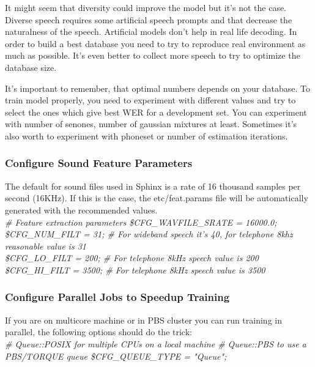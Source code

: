 \documentclass[12pt,a4paper,oldfontcommands]{memoir}
\begin{document}
It might seem that diversity could improve the model but it's not the case. Diverse speech requires some artificial speech prompts and that decrease the naturalness of the speech. Artificial models don't help in real life decoding. In order to build a best database you need to try to reproduce real environment as much as possible. It's even better to collect more speech to try to optimize the database size.

It's important to remember, that optimal numbers depends on your database. To train model properly, you need to experiment with different values and try to select the ones which give best WER for a development set. You can experiment with number of senones, number of gaussian mixtures at least. Sometimes it's also worth to experiment with phoneset or number of estimation iterations. 

\subsubsection{Configure Sound Feature Parameters}
The default for sound files used in Sphinx is a rate of 16 thousand samples per second (16KHz). If this is the case, the etc/feat.params file will be automatically generated with the recommended values. \\
\textit{
\# Feature extraction parameters
\$CFG\_WAVFILE\_SRATE = 16000.0;\\
\$CFG\_NUM\_FILT = 31; \# For wideband speech it's 40, for telephone 8khz reasonable value is 31\\
\$CFG\_LO\_FILT = 200; \# For telephone 8kHz speech value is 200\\
\$CFG\_HI\_FILT = 3500; \# For telephone 8kHz speech value is 3500\\
}

\subsubsection{Configure Parallel Jobs to Speedup Training}
If you are on multicore machine or in PBS cluster you can run training in parallel, the following options should do the trick: \\
\textit{
\# Queue::POSIX for multiple CPUs on a local machine
\# Queue::PBS to use a PBS/TORQUE queue
\$CFG\_QUEUE\_TYPE = "Queue";
}
\end{document}
